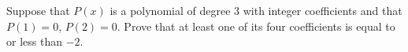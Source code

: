Suppose that $P(x)$ is a polynomial of degree $3$ with integer coefficients and
that $P(1) = 0$, $P(2) = 0$. Prove that at least one of its four coefficients
is equal to or less than $-2$.

